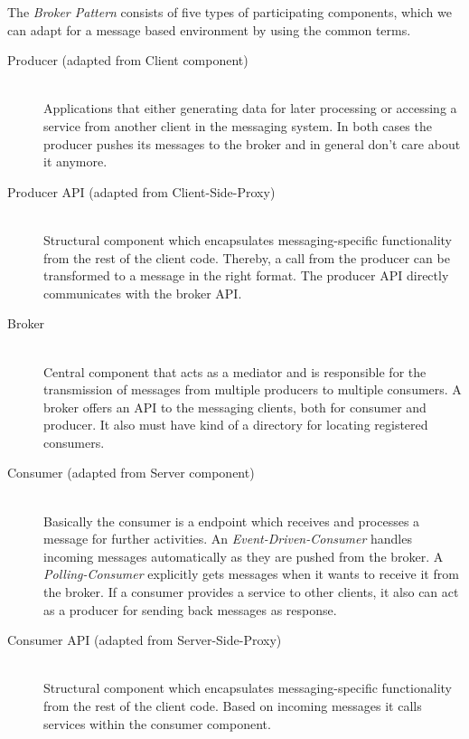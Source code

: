 The \textit{Broker Pattern} consists of five types of participating components,
which we can adapt for a message based environment by using the common terms.

\begin{description}
    \item[Producer (adapted from Client component)] \hfill \\
        {Applications that either generating data for later processing or
        accessing a service from another client in the messaging system. In both
        cases the producer pushes its messages to the broker and in general don't care 
        about it anymore.}
    \item[Producer API (adapted from Client-Side-Proxy)] \hfill \\
        {Structural component which encapsulates messaging-specific
        functionality from the rest of the client code. Thereby, a call from the producer
        can be transformed to a message in the right format. The producer API
        directly communicates with the broker API.}
    \item[Broker] \hfill \\
        {Central component that acts as a mediator and is responsible for the
        transmission of messages from multiple producers to multiple consumers.
        A broker offers an API to the messaging clients, both for consumer and
        producer. It also must have kind of a directory for locating registered
        consumers.} 
    \item[Consumer (adapted from Server component)] \hfill \\
        {Basically the consumer is a endpoint which receives and processes a
            message for further activities. An \textit{Event-Driven-Consumer}
            handles incoming messages automatically as they are pushed from the
            broker. A \textit{Polling-Consumer} explicitly gets messages when it
            wants to receive it from the broker. If a consumer provides a
            service to other clients, it also can act as a producer for sending
            back messages as response.}
\item[Consumer API (adapted from Server-Side-Proxy)] \hfill \\
        {Structural component which encapsulates messaging-specific
        functionality from the rest of the client code. Based on incoming
        messages it calls services within the consumer component. }
\end{description}

